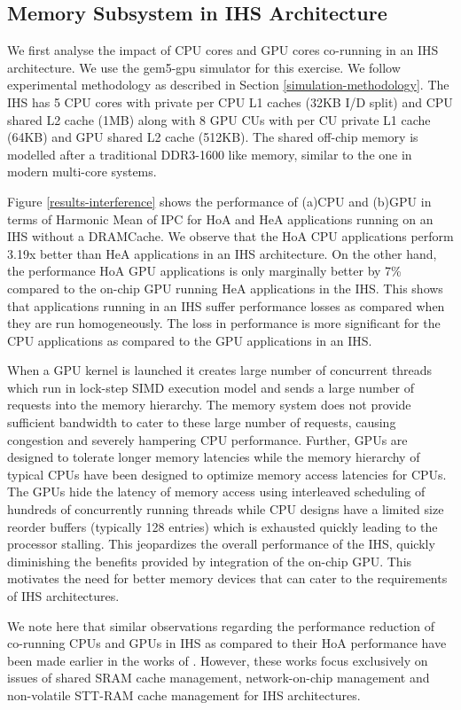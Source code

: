 \subsection{Memory Subsystem in IHS Architecture}
We first analyse the impact of CPU cores and GPU cores co-running in an IHS architecture. 
We use the gem5-gpu \cite{gem5-gpu} simulator for this exercise. We follow experimental methodology as described in Section \ref{simulation-methodology}. The IHS has 5 CPU cores with private per CPU L1 caches (32KB I/D split) and CPU shared L2 cache (1MB) along with 8 GPU CUs with per CU private L1 cache (64KB) and GPU shared L2 cache (512KB).
The shared off-chip memory is modelled after a traditional DDR3-1600 like memory, similar to the one in modern multi-core systems. 
\par Figure \ref{results-interference} shows the performance of (a)CPU and (b)GPU in terms of Harmonic Mean of IPC for HoA and HeA applications running on an IHS without a DRAMCache. We observe that the HoA CPU applications perform 3.19x better than HeA applications in an IHS architecture. On the other hand, the performance HoA GPU applications is only marginally better by 7\% compared to the on-chip GPU running HeA applications in the IHS. This shows that applications running in an IHS suffer performance losses as compared when they are run homogeneously. The loss in performance is more significant for the CPU applications as compared to the GPU applications in an IHS. 
\par When a GPU kernel is launched it creates large number of concurrent threads which run in lock-step SIMD execution model and sends a large number of requests into the memory hierarchy. The memory system does not provide sufficient bandwidth to cater to these large number of requests, causing congestion and severely hampering CPU performance. Further, GPUs are designed to tolerate longer memory latencies while the memory hierarchy of typical CPUs have been designed to optimize memory access latencies for CPUs. The GPUs hide the latency of memory access using interleaved scheduling of hundreds of concurrently running threads while CPU designs have a limited size reorder buffers (typically 128 entries) which is exhausted quickly leading to the processor stalling. This jeopardizes the overall performance of the IHS, quickly diminishing the benefits provided by integration of the on-chip GPU. This motivates the need for better memory devices that can cater to the requirements of IHS architectures.
\par We note here that similar observations regarding the performance reduction of co-running CPUs and GPUs in IHS as compared to their HoA performance have been made earlier in the works of \cite{helm,oscar}. However, these works focus exclusively on issues of shared SRAM cache management, network-on-chip management and non-volatile STT-RAM cache management for IHS architectures.


